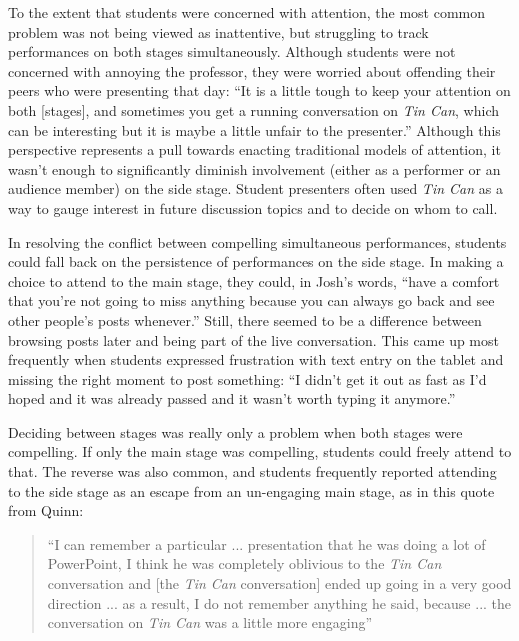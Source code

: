 
To the extent that students were concerned with attention, the most common problem was not being viewed as inattentive, but struggling to track performances on both stages simultaneously. Although students were not concerned with annoying the professor, they were worried about offending their peers who were presenting that day: ``It is a little tough to keep your attention on both [stages], and sometimes you get a running conversation on \emph{Tin Can}, which can be interesting but it is maybe a little unfair to the presenter.'' Although this perspective represents a pull towards enacting traditional models of attention, it wasn't enough to significantly diminish involvement (either as a performer or an audience member) on the side stage. Student presenters often used \emph{Tin Can} as a way to gauge interest in future discussion topics and to decide on whom to call.

In resolving the conflict between compelling simultaneous performances, students could fall back on the persistence of performances on the side stage. In making a choice to attend to the main stage, they could, in Josh's words, ``have a comfort that you're not going to miss anything because you can always go back and see other people's posts whenever.'' Still, there seemed to be a difference between browsing posts later and being part of the live conversation. This came up most frequently when students expressed frustration with text entry on the tablet and missing the right moment to post something: ``I didn't get it out as fast as I'd hoped and it was already passed and it wasn't worth typing it anymore.'' 



Deciding between stages was really only a problem when both stages were compelling. If only the main stage was compelling, students could freely attend to that. The reverse was also common, and students frequently reported attending to the side stage as an escape from an un-engaging main stage, as in this quote from Quinn:
\begin{quote}
``I can remember a particular ... presentation that he was doing a lot of PowerPoint, I think he was completely oblivious to the \emph{Tin Can} conversation and [the \emph{Tin Can} conversation] ended up going in a very good direction ... as a result, I do not remember anything he said, because ... the conversation on \emph{Tin Can} was a little more engaging''
\end{quote}


